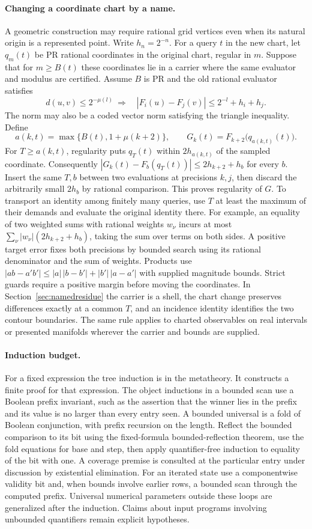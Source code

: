 \paragraph{Changing a coordinate chart by a name.}
A geometric construction may require rational grid vertices even when its natural origin is a represented point. Write \(h_n=2^{-n}\). For a query \(t\) in the new chart, let \(q_m(t)\) be PR rational coordinates in the original chart, regular in \(m\). Suppose that for \(m\ge B(t)\) these coordinates lie in a carrier where the same evaluator and modulus are certified. Assume \(B\) is PR and the old rational evaluator satisfies
\[
 d(u,v)\le 2^{-\mu(l)}
 \ \Longrightarrow\quad
 |F_i(u)-F_j(v)|\le 2^{-l}+h_i+h_j.
\]
The norm may also be a coded vector norm satisfying the triangle inequality. Define
\[
 a(k,t)=\max\{B(t),1+\mu(k+2)\},\qquad
 G_k(t)=F_{k+2}\big(q_{a(k,t)}(t)\big).
\]
For \(T\ge a(k,t)\), regularity puts \(q_T(t)\) within \(2h_{a(k,t)}\) of the sampled coordinate. Consequently \(|G_k(t)-F_b(q_T(t))|\le 2h_{k+2}+h_b\) for every \(b\). Insert the same \(T,b\) between two evaluations at precisions \(k,j\), then discard the arbitrarily small \(2h_b\) by rational comparison. This proves regularity of \(G\). To transport an identity among finitely many queries, use \(T\) at least the maximum of their demands and evaluate the original identity there. For example, an equality of two weighted sums with rational weights \(w_\nu\) incurs at most \(\sum_\nu |w_\nu|(2h_{k+2}+h_b)\), taking the sum over terms on both sides. A positive target error fixes both precisions by bounded search using its rational denominator and the sum of weights. Products use \(|ab-a'b'|\le |a|\,|b-b'|+|b'|\,|a-a'|\) with supplied magnitude bounds. Strict guards require a positive margin before moving the coordinates. In Section~\ref{sec:namedresidue} the carrier is a shell, the chart change preserves differences exactly at a common \(T\), and an incidence identity identifies the two contour boundaries. The same rule applies to charted observables on real intervals or presented manifolds wherever the carrier and bounds are supplied.

\paragraph{Induction budget.}
For a fixed expression the tree induction is in the metatheory. It constructs a finite proof for that expression. The object inductions in a bounded scan use a Boolean prefix invariant, such as the assertion that the winner lies in the prefix and its value is no larger than every entry seen. A bounded universal is a fold of Boolean conjunction, with prefix recursion on the length. Reflect the bounded comparison to its bit using the fixed-formula bounded-reflection theorem, use the fold equations for base and step, then apply quantifier-free induction to equality of the bit with one. A coverage premise is consulted at the particular entry under discussion by existential elimination. For an iterated state use a componentwise validity bit and, when bounds involve earlier rows, a bounded scan through the computed prefix. Universal numerical parameters outside these loops are generalized after the induction. Claims about input programs involving unbounded quantifiers remain explicit hypotheses.
